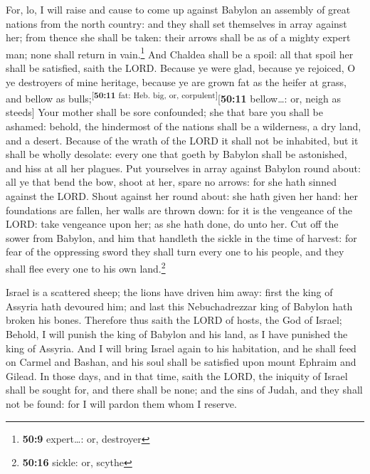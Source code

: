  For, lo, I will raise and cause to come up against
Babylon an assembly of great nations from the north country: and they
shall set themselves in array against her; from thence she shall be
taken: their arrows shall be as of a mighty expert man; none shall
return in vain.\footnote{\textbf{50:9} expert\ldots: or, destroyer}
 And Chaldea shall be a spoil: all that spoil her shall
be satisfied, saith the LORD.  Because ye were glad,
because ye rejoiced, O ye destroyers of mine heritage, because ye are
grown fat as the heifer at grass, and bellow as
bulls;\textsuperscript{{[}\textbf{50:11} fat: Heb. big, or,
corpulent{]}}{[}\textbf{50:11} bellow\ldots: or, neigh as steeds{]}
 Your mother shall be sore confounded; she that bare you
shall be ashamed: behold, the hindermost of the nations shall be a
wilderness, a dry land, and a desert.  Because of the
wrath of the LORD it shall not be inhabited, but it shall be wholly
desolate: every one that goeth by Babylon shall be astonished, and hiss
at all her plagues.  Put yourselves in array against
Babylon round about: all ye that bend the bow, shoot at her, spare no
arrows: for she hath sinned against the LORD.  Shout
against her round about: she hath given her hand: her foundations are
fallen, her walls are thrown down: for it is the vengeance of the LORD:
take vengeance upon her; as she hath done, do unto her. 
Cut off the sower from Babylon, and him that handleth the sickle in the
time of harvest: for fear of the oppressing sword they shall turn every
one to his people, and they shall flee every one to his own
land.\footnote{\textbf{50:16} sickle: or, scythe}

 Israel is a scattered sheep; the lions have driven him
away: first the king of Assyria hath devoured him; and last this
Nebuchadrezzar king of Babylon hath broken his bones. 
Therefore thus saith the LORD of hosts, the God of Israel; Behold, I
will punish the king of Babylon and his land, as I have punished the
king of Assyria.  And I will bring Israel again to his
habitation, and he shall feed on Carmel and Bashan, and his soul shall
be satisfied upon mount Ephraim and Gilead.  In those
days, and in that time, saith the LORD, the iniquity of Israel shall be
sought for, and there shall be none; and the sins of Judah, and they
shall not be found: for I will pardon them whom I reserve.

